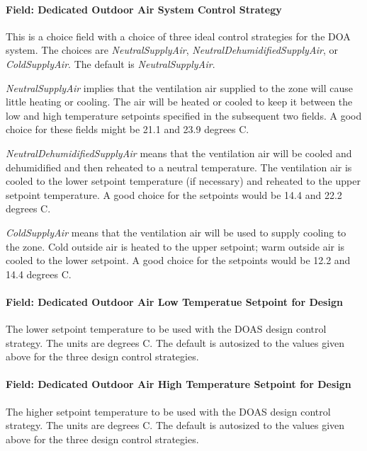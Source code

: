 \paragraph{Field: Dedicated Outdoor Air System Control Strategy}\label{field-dedicated-outdoor-air-system-control-strategy}

This is a choice field with a choice of three ideal control strategies for the DOA system. The choices are \emph{NeutralSupplyAir}, \emph{NeutralDehumidifiedSupplyAir}, or \emph{ColdSupplyAir}. The default is \emph{NeutralSupplyAir}.

\emph{NeutralSupplyAir} implies that the ventilation air supplied to the zone will cause little heating or cooling. The air will be heated or cooled to keep it between the low and high temperature setpoints specified in the subsequent two fields. A good choice for these fields might be 21.1 and 23.9 degrees C.

\emph{NeutralDehumidifiedSupplyAir} means that the ventilation air will be cooled and dehumidified and then reheated to a neutral temperature. The ventilation air is cooled to the lower setpoint temperature (if necessary) and reheated to the upper setpoint temperature. A good choice for the setpoints would be 14.4 and 22.2 degrees C.

\emph{ColdSupplyAir} means that the ventilation air will be used to supply cooling to the zone. Cold outside air is heated to the upper setpoint; warm outside air is cooled to the lower setpoint. A good choice for the setpoints would be 12.2 and 14.4 degrees C.

\paragraph{Field: Dedicated Outdoor Air Low Temperatue Setpoint for Design}\label{field-dedicated-outdoor-air-low-temperatue-setpoint-for-design}

The lower setpoint temperature to be used with the DOAS design control strategy. The units are degrees C. The default is autosized to the values given above for the three design control strategies.

\paragraph{Field: Dedicated Outdoor Air High Temperature Setpoint for Design}\label{field-dedicated-outdoor-air-high-temperature-setpoint-for-design}

The higher setpoint temperature to be used with the DOAS design control strategy. The units are degrees C. The default is autosized to the values given above for the three design control strategies.

